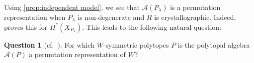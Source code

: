 \documentclass{amsart}
\theoremstyle{plain} \numberwithin{equation}{section}
\theoremstyle{definition}
\newtheorem{example}[theorem]{Example}
\newtheorem{question}{Question} \topmargin-2cm
\newcommand{\R}{\mathbb{R}}
\newcommand{\Z}{\mathbb{Z}}
\newcommand{\ip}[1]{\left\langle #1 \right\rangle}
\begin{document}
Using \cref{prop:independent model}, we see that $\mathcal{A}(P_{\lambda})$ is a permutation representation when $P_{\lambda}$ is non-degenerate and $R$ is crystallographic. Indeed, \cite{stembridgePermutationRepresentationsWeyl1994} proves this for $H^*(X_{P_{\lambda}})$.
This leads to the following natural question:
\begin{question}[{cf.~\cite[Question 11.1]{stembridgePermutationRepresentationsWeyl1994}}]
For which $W$-symmetric polytopes $P$ is the polytopal algebra $\mathcal{A}(P)$ a permutation representation of $W$?
\end{question}














      

        

  

  
\end{document}
